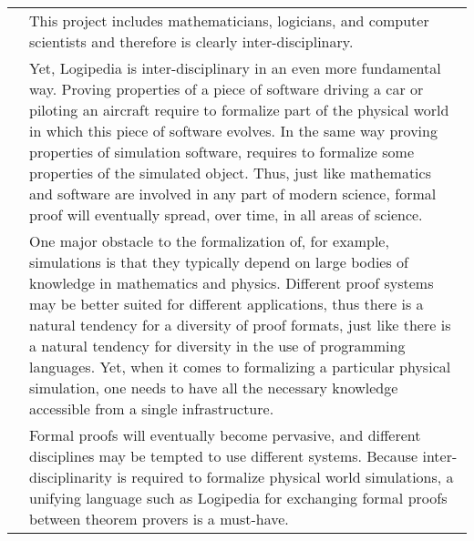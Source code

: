 \begin{longtable}{|p{}|p{}|}
&
This project includes mathematicians, logicians, and computer
scientists and therefore is clearly inter-disciplinary.\\
&
\hspace{0.4cm}
Yet, Logipedia is inter-disciplinary in an even more fundamental
way. Proving properties of a piece of software driving a car or
piloting an aircraft require to formalize part of the physical world
in which this piece of software evolves. In the same way proving
properties of simulation software, requires to formalize some
properties of the simulated object.  Thus, just like mathematics and
software are involved in any part of modern science, formal proof will
eventually spread, over time, in all areas of science.\\
&
\hspace{0.4cm}
One major obstacle to the formalization of, for example, simulations
is that they typically depend on large bodies of knowledge in
mathematics and physics.  Different proof systems may be better
suited for different applications, thus there is a natural tendency
for a diversity of proof formats, just like there is a natural
tendency for diversity in the use of programming languages.  Yet, when
it comes to formalizing a particular physical simulation, one needs to
have all the necessary knowledge accessible from a single infrastructure.\\
&
\hspace{0.4cm}
Formal proofs will eventually become pervasive, and
different disciplines may be tempted to use different systems.
Because inter-disciplinarity is required to formalize physical world
simulations, a unifying language such as Logipedia for exchanging
formal proofs between theorem provers is a must-have.\\
\hline
\end{longtable}


